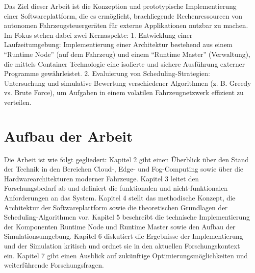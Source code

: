 Das Ziel dieser Arbeit ist die Konzeption und prototypische Implementierung einer Softwareplattform, die es ermöglicht, brachliegende Rechenressourcen von autonomen Fahrzeugsteuergeräten für externe Applikationen nutzbar zu machen. Im Fokus stehen dabei zwei Kernaspekte: 
1. Entwicklung einer Laufzeitumgebung: Implementierung einer Architektur bestehend aus einem \enquote{Runtime Node} (auf dem Fahrzeug) und einem \enquote{Runtime Master} (Verwaltung), die mittels Container Technologie eine isolierte und sichere Ausführung externer Programme gewährleistet. 
2. Evaluierung von Scheduling-Strategien: Untersuchung und simulative Bewertung verschiedener Algorithmen (z. B. Greedy vs. Brute Force), um Aufgaben in einem volatilen Fahrzeugnetzwerk effizient zu verteilen.

\section{Aufbau der Arbeit}

Die Arbeit ist wie folgt gegliedert: Kapitel 2 gibt einen Überblick über den Stand der Technik in den Bereichen Cloud-, Edge- und Fog-Computing sowie über die Hardwarearchitekturen moderner Fahrzeuge. Kapitel 3 leitet den Forschungsbedarf ab und definiert die funktionalen und nicht-funktionalen Anforderungen an das System. Kapitel 4 stellt das methodische Konzept, die Architektur der Softwareplattform sowie die theoretischen Grundlagen der Scheduling-Algorithmen vor. Kapitel 5 beschreibt die technische Implementierung der Komponenten Runtime Node und Runtime Master sowie den Aufbau der Simulationsumgebung. Kapitel 6 diskutiert die Ergebnisse der Implementierung und der Simulation kritisch und ordnet sie in den aktuellen Forschungskontext ein. Kapitel 7 gibt einen Ausblick auf zukünftige Optimierungsmöglichkeiten und weiterführende Forschungsfragen.

